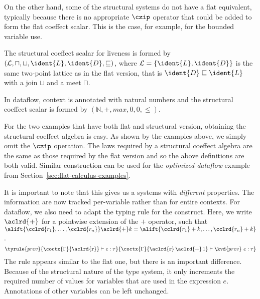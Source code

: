 On the other hand, some of the structural systems do not have a flat equivalent, typically
because there is no appropriate $\czip$ operator that could be added to form the flat coeffect
scalar. This is the case, for example, for the bounded variable use.

\begin{example}
The structural coeffect scalar for liveness is formed by
$(\mathcal{L}, \sqcap, \sqcup, \ident{L}, \ident{D}, \sqsubseteq)$, where $\mathcal{L}=\{ \ident{L}, \ident{D} \}$ is
the same two-point lattice as in the flat version, that is $\ident{D} \sqsubseteq \ident{L}$
with a join $\sqcup$ and a meet $\sqcap$.
\end{example}

\begin{example}
In dataflow, context is annotated with natural numbers and the structural coeffect scalar is formed
by $(\mathbb{N}, +, \mathit{max}, 0, 0, \leq)$.
\end{example}

\noindent
For the two examples that have both flat and structural version, obtaining the structural coeffect
algebra is easy. As shown by the examples above, we simply omit the $\czip$ operation. The laws
required by a structural coeffect algebra are the same as those required by the flat version
and so the above definitions are both valid. Similar construction can be used for the
\emph{optimized dataflow} example from Section~\ref{sec:flat-calculus-examples}.

It is important to note that this gives us a systems with \emph{different} properties. The
information are now tracked per-variable rather than for entire contexts. For dataflow,
we also need to adapt the typing rule for the  construct. Here, we write $\aclrd{+}$
for a pointwise extension of the $+$ operator, such that
$\alift{\cclrd{r_1}, \ldots, \cclrd{r_n}} \aclrd{+} k = \alift{\cclrd{r_1} + k, \ldots, \cclrd{r_n} + k}$.
%
\begin{equation*}
\tyrule{prev}
  { \coctx{\Gamma}{\aclrd{\textbf{r}}} \vdash e : \tau }
  { \coctx{\Gamma}{\aclrd{\textbf{r}} \,\aclrd{+}\, 1} \vdash \kvd{prev}~e : \tau }
\end{equation*}
%
The rule appears similar to the flat one, but there is an important difference. Because of the
structural nature of the type system, it only increments the required number of values for
variables that are used in the expression $e$. Annotations of other variables can be left
unchanged.

